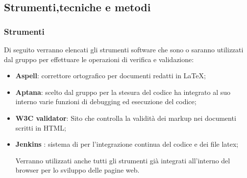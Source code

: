 
\subsection{Strumenti,tecniche e metodi}

\subsubsection{Strumenti}
\label{sec:strumenti}
Di seguito verranno elencati gli strumenti software che sono o saranno utilizzati dal gruppo per effettuare le operazioni di verifica e validazione:
\begin{itemize}

\item \textbf{Aspell}: correttore ortografico per documenti redatti in \LaTeX;

\item \textbf{Aptana}: scelto dal gruppo per la stesura del codice ha integrato al suo interno varie funzioni di debugging ed esecuzione del codice;

\item \textbf{W3C validator}: Sito che controlla la validità dei markup nei documenti scritti in HTML;

\item \textbf{Jenkins} : sistema di per l'integrazione continua del codice e dei file latex;

Verranno utilizzati anche tutti gli strumenti già integrati all'interno del browser per lo sviluppo delle pagine web.

\end{itemize}
